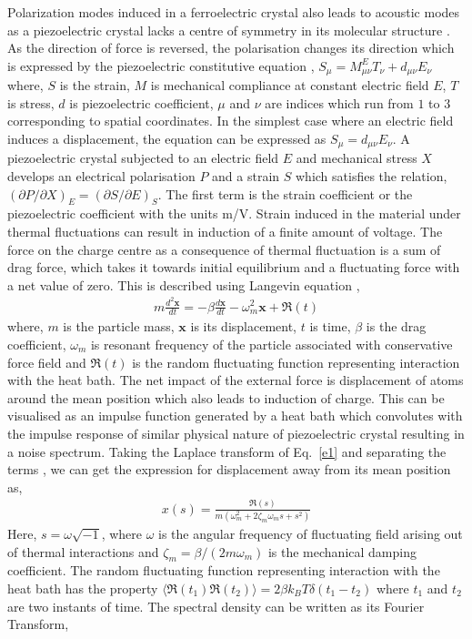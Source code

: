 \documentclass[12pt,column,showpacs,pre,preprintnumbers,amsmath,amssymb,aps,standalone]{revtex4-2}
\begin{document}
Polarization modes induced in a ferroelectric crystal also leads to acoustic modes as a piezoelectric crystal lacks a centre of symmetry in its molecular structure \cite{18}. As the direction of force is reversed, the polarisation changes its direction which is expressed by the piezoelectric constitutive equation \cite{18},
$S_\mu=M_{\mu \nu}^ET_{\nu}+d_{\mu \nu}E_{\nu} $ where, $S$ is the strain, $M$ is mechanical compliance at constant electric field $E$, $T$ is stress, $d$ is piezoelectric coefficient, $\mu$ and $\nu$ are indices which run from $ 1 $ to $ 3 $ corresponding to spatial coordinates. In the simplest case where an electric field induces a displacement, the equation can be expressed as $S_\mu=d_{\mu \nu}E_\nu$. A piezoelectric crystal subjected to an electric field $E$ and mechanical stress $X$ develops an electrical polarisation $P$ and a strain $S$ which satisfies the relation,  
$(\partial P/ \partial X)_E=(\partial S/\partial E)_S$. The first term is the strain coefficient or the piezoelectric coefficient with the units m/V. Strain induced in the material under thermal fluctuations can result in induction of a finite amount of voltage.
The force on the charge centre as a consequence of thermal fluctuation is a sum of drag force, which takes it towards initial equilibrium and a fluctuating force with a net value of zero. This is described using Langevin equation \cite{19}, 
\begin{align} \label{e1}
m\frac{d^2\bm x}{dt}=-\beta  \frac{d \bm x}{dt}-\omega_m^2\bm x+\bm \Re(t)
\end{align}  
where, $m$ is the particle mass, $\bm x$ is its displacement, $ t $ is time, $\beta$  is the drag coefficient, $\omega_m$  is resonant frequency of the particle associated with conservative force field and $\bm \Re(t)$  is the random fluctuating function representing interaction with the heat bath. The net impact of the external force is displacement of atoms around the mean position which also leads to induction of charge. This can be visualised as an impulse function generated by a heat bath which convolutes with the impulse response of similar physical nature of piezoelectric crystal resulting in a noise spectrum. Taking the Laplace transform of Eq.~\ref{e1} and separating the terms \cite{20}, we can get the expression for displacement away from its mean position as,   
\begin{align} \label{e2}
x(s)=\frac{\Re(s)}{m(\omega_m^2+2\zeta_m \omega_ms+s^2)}  
\end{align}       
 Here, $ s=\omega \sqrt{-1} $, where $ \omega $ is the angular frequency of fluctuating field arising out of thermal interactions and $ \zeta_m=\beta/(2m \omega_m) $ is the mechanical damping coefficient. The random fluctuating function representing interaction with the heat bath has the property $\langle\Re(t_1)\Re(t_2)\rangle =2\beta k_BT \delta(t_1-t_2)$ where $t_1$ and $t_2$ are two instants of time. The spectral density can be written as its Fourier Transform,
\end{document}
